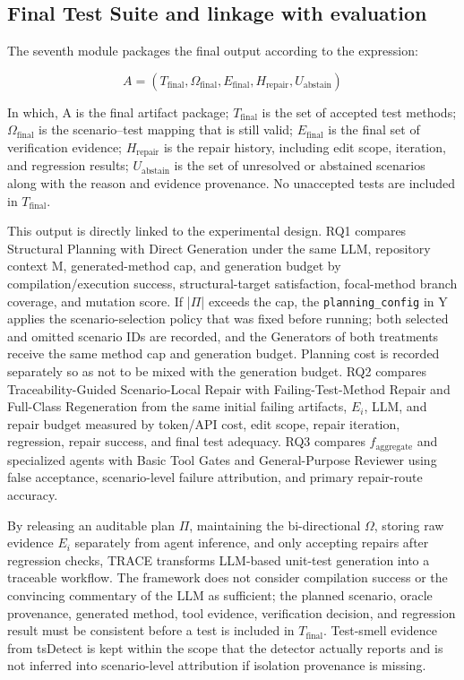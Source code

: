 \documentclass[pdflatex,sn-basic,Numbered,iicol]{sn-jnl}
\begin{document}
\subsection{Final Test Suite and linkage with evaluation}\label{subsec:final-suite}

The seventh module packages the final output according to the expression:

\begin{equation}
A = (T_{\mathrm{final}},\Omega_{\mathrm{final}},E_{\mathrm{final}},H_{\mathrm{repair}},U_{\mathrm{abstain}})
\label{eq:final-artifact}
\end{equation}

In which, A is the final artifact package; $T_{\mathrm{final}}$ is the set of accepted test methods; $\Omega_{\mathrm{final}}$ is the scenario--test mapping that is still valid; $E_{\mathrm{final}}$ is the final set of verification evidence; $H_{\mathrm{repair}}$ is the repair history, including edit scope, iteration, and regression results; $U_{\mathrm{abstain}}$ is the set of unresolved or abstained scenarios along with the reason and evidence provenance. No unaccepted tests are included in $T_{\mathrm{final}}$.

This output is directly linked to the experimental design. RQ1 compares Structural Planning with Direct Generation under the same LLM, repository context M, generated-method cap, and generation budget by compilation/execution success, structural-target satisfaction, focal-method branch coverage, and mutation score. If |\ensuremath{\Pi}| exceeds the cap, the \texttt{planning\_config} in Y applies the scenario-selection policy that was fixed before running; both selected and omitted scenario IDs are recorded, and the Generators of both treatments receive the same method cap and generation budget. Planning cost is recorded separately so as not to be mixed with the generation budget. RQ2 compares Traceability-Guided Scenario-Local Repair with Failing-Test-Method Repair and Full-Class Regeneration from the same initial failing artifacts, $E_i$, LLM, and repair budget measured by token/API cost, edit scope, repair iteration, regression, repair success, and final test adequacy. RQ3 compares $f_{\mathrm{aggregate}}$ and specialized agents with Basic Tool Gates and General-Purpose Reviewer using false acceptance, scenario-level failure attribution, and primary repair-route accuracy.

By releasing an auditable plan \ensuremath{\Pi}, maintaining the bi-directional \ensuremath{\Omega}, storing raw evidence $E_i$ separately from agent inference, and only accepting repairs after regression checks, TRACE transforms LLM-based unit-test generation into a traceable workflow. The framework does not consider compilation success or the convincing commentary of the LLM as sufficient; the planned scenario, oracle provenance, generated method, tool evidence, verification decision, and regression result must be consistent before a test is included in $T_{\mathrm{final}}$. Test-smell evidence from tsDetect is kept within the scope that the detector actually reports and is not inferred into scenario-level attribution if isolation provenance is missing.
\end{document}
